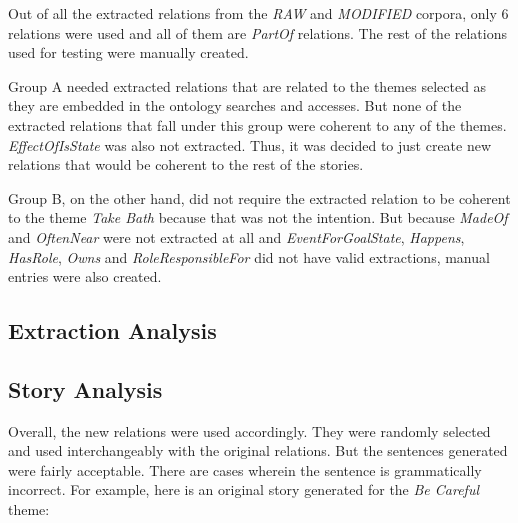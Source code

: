 Out of all the extracted relations from the \textit{RAW} and \textit{MODIFIED} corpora, only 6 relations were used and all of them are \textit{PartOf} relations. The rest of the relations used for testing were manually created. 

Group A needed extracted relations that are related to the themes selected as they are embedded in the ontology searches and accesses. But none of the extracted relations that fall under this group were coherent to any of the themes. \textit{EffectOfIsState} was also not extracted. Thus, it was decided to just create new relations that would be coherent to the rest of the stories. 

Group B, on the other hand, did not require the extracted relation to be coherent to the theme \textit{Take Bath} because that was not the intention. But because \textit{MadeOf} and \textit{OftenNear} were not extracted at all and \textit{EventForGoalState}, \textit{Happens}, \textit{HasRole}, \textit{Owns} and \textit{RoleResponsibleFor} did not have valid extractions, manual entries were also created.

\subsection{Extraction Analysis}
\label{sec:extractionanalysis}



\subsection{Story Analysis}
\label{sec:storyanalysis}

Overall, the new relations were used accordingly. They were randomly selected and used interchangeably with the original relations. But the sentences generated were fairly acceptable. There are cases wherein the sentence is grammatically incorrect. For example, here is an original story generated for the \textit{Be Careful} theme:

